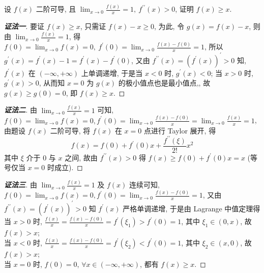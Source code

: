 \begin{example}[1995 数学 (二)]
    设 $ f(x) $ 二阶可导, 且 $ \displaystyle\lim _{x \to 0} \frac{f(x)}{x}=1,~f^{\prime \prime}(x)>0$, 
    证明 $ f(x) \geqslant x .$
\end{example}

\begin{proof}[{\songti \textbf{证法一}}]
    要证 $ f(x) \geqslant x$, 只需证 $ f(x)-x \geqslant 0$, 为此, 令 $ g(x)=f(x)-x$, 则由 $\displaystyle \lim _{x \to 0} \frac{f(x)}{x}=1$, 
    得 $\displaystyle f(0)=\lim _{x \to 0} f(x)=0,~f^{\prime}(0)=\lim _{x \to 0} \frac{f(x)-f(0)}{x}=1$, 
    所以 $ g^{\prime}(x)=f^{\prime}(x)-1=f^{\prime}(x)-f^{\prime}(0)$, 
    又由 $ f^{\prime \prime}(x)=\left(f^{\prime}(x)\right)^{\prime}>0 $ 知, $f^{\prime}(x)$  在 $ (-\infty,+\infty)$ 上单调递增, 
    于是当 $ x<0 $ 时, $g^{\prime}(x)<0$; 当 $ x>0 $ 时, $g^{\prime}(x)>0$, 从而知 $ x=0 $ 为 $ g(x) $ 的极小值点也是最小值点,, 
    故 $ g(x) \geqslant g(0)=0$, 即 $ f(x) \geqslant x .$
\end{proof}
\begin{proof}[{\songti \textbf{证法二}}]
    由 $\displaystyle \lim _{x \to 0} \frac{f(x)}{x}=1 $ 可知, $\displaystyle f(0)=\lim _{x \to 0} f(x)=0, f^{\prime}(0)=\lim _{x \to 0} \frac{f(x)-f(0)}{x}= \lim _{x \to 0} \frac{f(x)}{x}=1$, 
    由题设 $ f(x) $ 二阶可导, 将 $ f(x) $ 在 $ x=0 $ 点进行 Taylor 展开, 得
    $$f(x)=f(0)+f^{\prime}(0) x+\frac{f^{\prime \prime}(\xi)}{2 !} x^{2}$$
    其中 $ \xi $ 介于 $0$ 与 $ x $ 之间, 
    故由 $ f^{\prime \prime}(x)>0 $ 得 $ f(x) \geqslant f(0)+f^{\prime}(0) x=x $ (等号仅当 $ x=0 $ 时成立).
\end{proof}
\begin{proof}[{\songti \textbf{证法三}}]
    由 $\displaystyle \lim _{x \to 0} \frac{f(x)}{x}=1 $ 及 $ f(x) $ 连续可知, $\displaystyle f(0)=\lim _{x \to 0} f(x)=0, f^{\prime}(0)= \lim _{x \to 0} \frac{f(x)-f(0)}{x}=1$, 
    又由 $ f^{\prime \prime}(x)=\left(f^{\prime}(x)\right)^{\prime}>0 $ 知 $ f^{\prime}(x) $ 严格单调递增,  于是由 Lagrange 中值定理得\\
    当 $ x>0 $ 时, $\displaystyle\frac{f(x)}{x}=\frac{f(x)-f(0)}{x}=f^{\prime}\left(\xi_{1}\right)>f^{\prime}(0)=1$, 其中 $ \xi_{1} \in(0, x)$, 故 $ f(x)>x$; \\
    当 $ x<0 $ 时, $\displaystyle\frac{f(x)}{x}=\frac{f(x)-f(0)}{x}=f^{\prime}\left(\xi_{2}\right)<f^{\prime}(0)=1$, 其中 $ \xi_{2} \in(x, 0)$, 故 $ f(x)>x$; \\
    当 $ x=0 $ 时, $f(0)=0$, $\forall x \in(-\infty,+\infty)$, 都有 $ f(x) \geqslant x .$
\end{proof}


